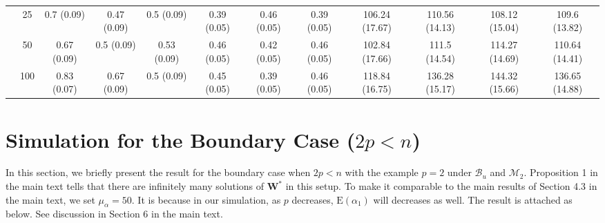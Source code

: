 \documentclass[11pt]{article}
\def\mbf#1{\mathbf{#1}} %
\def\mc#1{\mathcal{#1}} %
\def\E#1{\mathrm{E}(#1)} %
\theoremstyle{definition}
\begin{document}
\begin{table}[H]
\begin{center}
{\begin{tabular}{cc|ccc|ccc|cccc|}
    & 25  & 0.7 (0.09) & 0.47 (0.09) & 0.5 (0.09) & 0.39 (0.05) & 0.46 (0.05) & 0.39 (0.05) & 106.24 (17.67) & 110.56 (14.13) & 108.12 (15.04) & 109.6 (13.82) \\ 
    & 50  & 0.67 (0.09) & 0.5 (0.09) & 0.53 (0.09) & 0.46 (0.05) & 0.42 (0.05) & 0.46 (0.05) & 102.84 (17.66) & 111.5 (14.54) & 114.27 (14.69) & 110.64 (14.41) \\ 
    & 100  & 0.83 (0.07) & 0.67 (0.09) & 0.5 (0.09) & 0.45 (0.05) & 0.39 (0.05) & 0.46 (0.05) & 118.84 (16.75) & 136.28 (15.17) & 144.32 (15.66) & 136.65 (14.88) \\ 
\end{tabular}}
   \end{center}
      \vspace{-.5cm}
\end{table}

\section{Simulation for the Boundary Case ($2p < n$)}

\label{boundary}

In this section, we briefly present the result for the boundary case when $2p < n$ with the example $p = 2$ under $\mc{B}_u$ and $\mc{M}_2$. Proposition 1 in the main text tells that there are infinitely many solutions of $\mbf{W}^*$ in this setup. To make it comparable to the main results of Section 4.3 in the main text, we set $\mu_{\alpha}=50$. It is because in our simulation, as $p$ decreases, $\E{\alpha_1}$ will decreases as well. The result is attached as below. See discussion in Section 6 in the main text.
\end{document}
